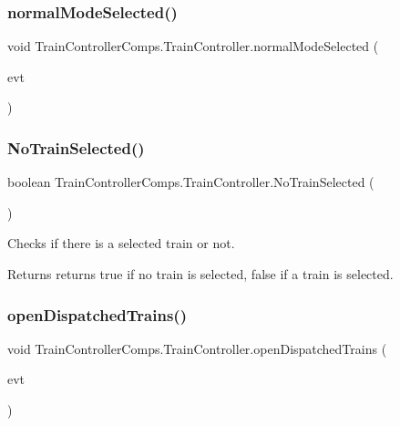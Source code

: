 \subsubsection{\texorpdfstring{normal\+Mode\+Selected()}{normalModeSelected()}}
{\footnotesize\ttfamily void Train\+Controller\+Comps.\+Train\+Controller.\+normal\+Mode\+Selected (\begin{DoxyParamCaption}\item[{java.\+awt.\+event.\+Action\+Event}]{evt }\end{DoxyParamCaption})\hspace{0.3cm}{\ttfamily [private]}}

\mbox{\label{classTrainControllerComps_1_1TrainController_a9d02501f35c2c6b12ffcc30fb4ad16e7}} 
\subsubsection{\texorpdfstring{No\+Train\+Selected()}{NoTrainSelected()}}
{\footnotesize\ttfamily boolean Train\+Controller\+Comps.\+Train\+Controller.\+No\+Train\+Selected (\begin{DoxyParamCaption}{ }\end{DoxyParamCaption})\hspace{0.3cm}{\ttfamily [private]}}



Checks if there is a selected train or not. 

\begin{DoxyReturn}{Returns}
returns true if no train is selected, false if a train is selected. 
\end{DoxyReturn}
\mbox{\label{classTrainControllerComps_1_1TrainController_a917139f8b8d210b2093f8249ef58eff1}} 
\subsubsection{\texorpdfstring{open\+Dispatched\+Trains()}{openDispatchedTrains()}}
{\footnotesize\ttfamily void Train\+Controller\+Comps.\+Train\+Controller.\+open\+Dispatched\+Trains (\begin{DoxyParamCaption}\item[{java.\+awt.\+event.\+Action\+Event}]{evt }\end{DoxyParamCaption})\hspace{0.3cm}{\ttfamily [private]}}



